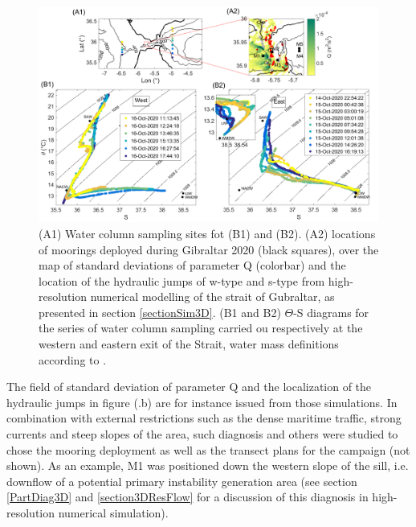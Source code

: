  
\begin{figure}[!h]
 \includegraphics[width=\textwidth]{./GBR3D/Fig_Moor.png}
 \caption {(A1) Water column sampling sites fot (B1) and (B2). (A2) locations of moorings deployed during Gibraltar 2020 (black squares), over the map of standard deviations of parameter Q (colorbar) and the location of the hydraulic jumps of w-type and s-type from high-resolution numerical modelling of the strait of Gubraltar, as presented in section \ref{sectionSim3D}. (B1 and B2) $\Theta$-S diagrams for the series of water column sampling carried ou respectively at the western and eastern exit of the Strait, water mass definitions according to \color{red}\citet{najanro_2014}\color{black}.}
 \label{fig_moor}
\end{figure}

The field of standard deviation of parameter Q and the localization of the hydraulic jumps in figure (.b) are for instance issued from those simulations. In combination with external restrictions such as the dense maritime traffic, strong currents and steep slopes of the area, such diagnosis and others were studied to chose the mooring deployment as well as the transect plans for the campaign (not shown). As an example, M1 was positioned down the western slope of the sill, i.e. downflow of a potential primary instability generation area (see section \ref{PartDiag3D} and \ref{section3DResFlow} for a discussion of this diagnosis in high-resolution numerical simulation).

